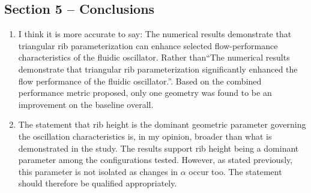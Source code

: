 \documentclass[11pt]{article}
\begin{document}
	\subsection*{Section 5 -- Conclusions}
	
	\begin{enumerate}
		\item I think it is more accurate to say: The numerical results demonstrate that triangular rib parameterization can enhance selected flow-performance characteristics of the fluidic oscillator. Rather than``The numerical results demonstrate that triangular rib parameterization significantly enhanced the flow performance of the fluidic oscillator.''. Based on the combined performance metric proposed, only one geometry was found to be an improvement on the baseline overall.
		
		\item The statement that rib height is the dominant geometric parameter governing the oscillation characteristics is, in my opinion, broader than what is demonstrated in the study. The results support rib height being a dominant parameter among the configurations tested. However, as stated previously, this parameter is not isolated as changes in $\alpha$ occur too. The statement should therefore be qualified appropriately.
	\end{enumerate}
	
\end{document}

